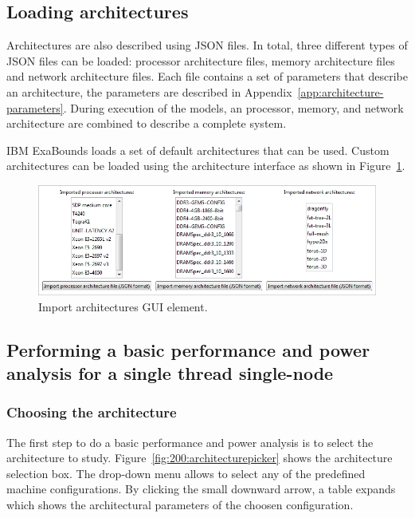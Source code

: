 \subsection{Loading architectures}

Architectures are also described using JSON files. In total, three different types of JSON files can be loaded: processor architecture files, memory architecture files and network architecture files. Each file contains a set of parameters that describe an architecture, the parameters are described in Appendix~\ref{app:architecture-parameters}. During execution of the models, an processor, memory, and network architecture are combined to describe a complete system.

IBM ExaBounds loads a set of default architectures that can be used. Custom architectures can be loaded using the architecture interface as shown in Figure~\ref{fig:200:loadarchitectures}.

\begin{figure}
  \centering
  \includegraphics[width=0.95\columnwidth]{img/load-architecture.png}
  \caption{Import architectures GUI element.}
  \label{fig:200:loadarchitectures}
\end{figure}

\subsection{Performing a basic performance and power analysis for a single thread single-node}

\subsubsection{Choosing the architecture}

The first step to do a basic performance and power analysis is to select the architecture to study.
Figure~\ref{fig:200:architecturepicker} shows the architecture selection box. The drop-down menu allows to select any of the predefined machine configurations. By clicking the small downward arrow, a table expands which shows the architectural parameters of the choosen configuration.

